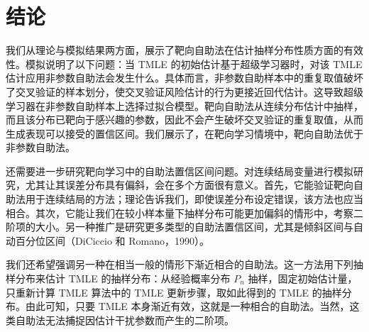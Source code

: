 \section{结论}

我们从理论与模拟结果两方面，展示了靶向自助法在估计抽样分布性质方面的有效性。模拟说明了以下问题：当 TMLE 的初始估计基于超级学习器时，对该 TMLE 估计应用非参数自助法会发生什么。具体而言，非参数自助样本中的重复取值破坏了交叉验证的样本划分，使交叉验证风险估计的行为更接近回代估计。这导致超级学习器在非参数自助样本上选择过拟合模型。靶向自助法从连续分布估计中抽样，而且该分布已靶向于感兴趣的参数，因此不会产生破坏交叉验证的重复取值，从而生成表现可以接受的置信区间。我们展示了，在靶向学习情境中，靶向自助法优于非参数自助法。

还需要进一步研究靶向学习中的自助法置信区间问题。对连续结局变量进行模拟研究，尤其让其误差分布具有偏斜，会在多个方面很有意义。首先，它能验证靶向自助法用于连续结局的方法；理论告诉我们，即使误差分布设定错误，该方法也应当相合。其次，它能让我们在较小样本量下抽样分布可能更加偏斜的情形中，考察二阶项的大小。另一种推广是研究更多类型的自助法置信区间，尤其是倾斜区间与自动百分位区间（DiCiccio 和 Romano，1990）。

我们还希望强调另一种在相当一般的情形下渐近相合的自助法。这一方法用下列抽样分布来估计 TMLE 的抽样分布：从经验概率分布 $P_n$ 抽样，固定初始估计量，只重新计算 TMLE 算法中的 TMLE 更新步骤，取如此得到的 TMLE 的抽样分布。由此可知，只要 TMLE 本身渐近有效，这就是一种相合的自助法。当然，这类自助法无法捕捉因估计干扰参数而产生的二阶项。
